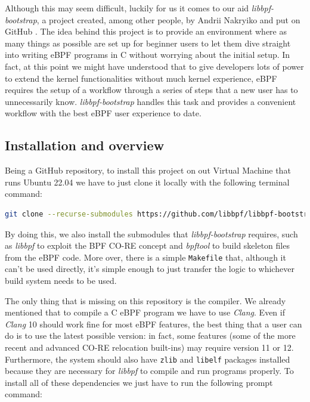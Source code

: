 Although this may seem difficult, luckily for us it comes to our aid \textit{libbpf-bootstrap}, a project created, among other people, by Andrii Nakryiko and put on GitHub \cite{libbpfbootstrapGithubRepo}.
The idea behind this project is to provide an environment where as many things as possible are set up for beginner users to let them dive straight into writing eBPF programs in C without worrying about the initial setup.
In fact, at this point we might have understood that to give developers lots of power to extend the kernel functionalities without much kernel experience, eBPF requires the setup of a workflow through a series of steps that a new user has to unnecessarily know.
\textit{libbpf-bootstrap} handles this task and provides a convenient workflow with the best eBPF user experience to date.

\subsection{Installation and overview}

Being a GitHub repository, to install this project on out Virtual Machine that runs Ubuntu 22.04 we have to just clone it locally with the following terminal command:

\begin{lstlisting}[language=bash, caption={libbpf-bootstrap clone command}]
	git clone --recurse-submodules https://github.com/libbpf/libbpf-bootstrap
\end{lstlisting}

By doing this, we also install the submodules that \textit{libbpf-bootstrap} requires, such as  \textit{libbpf} to exploit the BPF CO-RE concept and \textit{bpftool} to build skeleton files from the eBPF code.
More over, there is a simple \verb|Makefile| that, although it can't be used directly, it's simple enough to just transfer the logic to whichever build system needs to be used.

The only thing that is missing on this repository is the compiler.
We already mentioned that to compile a C eBPF program we have to use \textit{Clang}.
Even if \textit{Clang} 10 should work fine for most eBPF features, the best thing that a user can do is to use the latest possible version: in fact, some features (some of the more recent and advanced CO-RE relocation built-ins) may require version 11 or 12.
Furthermore, the system should also have \verb|zlib| and \verb|libelf| packages installed because they are necessary for \textit{libbpf} to compile and run programs properly.
To install all of these dependencies we just have to run the following prompt command:

